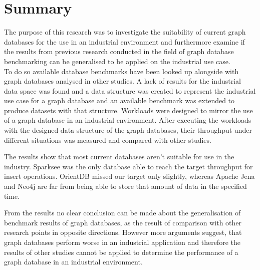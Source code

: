 \section{Summary}
The purpose of this research was to investigate the suitability of current graph databases for the use in an industrial environment and furthermore examine if the results from previous research conducted in the field of graph database benchmarking can be generalised to be applied on the industrial use case.\\
To do so available database benchmarks have been looked up alongside with graph databases analysed in other studies.
A lack of results for the industrial data space was found and a data structure was created to represent the industrial use case for a graph database and an available benchmark was extended to produce datasets with that structure.
Workloads were designed to mirror the use of a graph database in an industrial environment.
After executing the workloads with the designed data structure of the graph databases,
their throughput under different situations was measured and compared with other studies.

The results show that most current databases aren't suitable for use in the industry.
Sparksee was the only database able to reach the target throughput for insert operations.
OrientDB missed our target only slightly,
whereas Apache Jena and Neo4j are far from being able to store that amount of data in the specified time.

From the results no clear conclusion can be made about the generalisation of benchmark results of graph databases,
as the result of comparison with other research points in opposite directions.
However more arguments suggest,
that graph databases perform worse in an industrial application and therefore the results of other studies cannot be applied to determine the performance of a graph database in an industrial environment.
